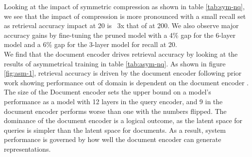 \begin{table}[!htb]
    \centering
    \caption{Impact of Structural pruning before fine-tuning on Retrieval Accuracy on NQ passage retrieval dataset}
    \label{tab:sym-nq}
\end{table}
Looking at the impact of symmetric compression as shown in table \ref{tab:sym-nq}, we see that the impact of compression is more pronounced with a small recall set as retrieval accuracy impact at 20 is ~3x that of at 200. We also observe major accuracy gains by fine-tuning the pruned model with a 4\% gap for the 6-layer model and a 6\% gap for the 3-layer model for recall at 20. \\
We find that the document encoder drives retrieval accuracy by looking at the results of asymmetrical training in table \ref{tab:asym-nq}. As shown in figure \ref{fig:asm-1}, retrieval accuracy is driven by the document encoder following prior work showing performance out of domain is dependent on the document encoder \cite{Li2021EncoderAO}. \\
The size of the Document encoder sets the upper bound on a model's performance as a model with 12 layers in the query encoder, and 9 in the document encoder performs worse than one with the numbers flipped. The dominance of the document encoder is a logical outcome, as the latent space for queries is simpler than the latent space for documents. As a result, system performance is governed by how well the document encoder can generate representations. \\

